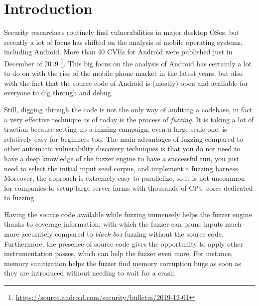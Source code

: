 \documentclass[a4paper,11pt,oneside]{report}
\begin{document}
\chapter{Introduction}

Security researchers routinely find vulnerabilities in major desktop OSes, but 
recently a lot of focus has shifted on the analysis of mobile operating 
systems, including Android.  More than 40 CVEs for Android were published just 
in December of 2019 
\footnote{\url{https://source.android.com/security/bulletin/2019-12-01}}.  This 
big focus on the analysis of Android has certainly a lot to do on with the rise 
of the mobile phone market in the latest years, but also with the fact that the 
source code of Android is (mostly) open and available for everyone to dig 
through and debug.

Still, digging through the code is not the only way of auditing a codebase, in 
fact a very effective technique as of today is the process of \emph{fuzzing}.  
It is taking a lot of traction because setting up a fuzzing campaign, even a 
large scale one, is relatively easy for beginners too. The main advantages of 
fuzzing compared to other automatic vulnerability discovery techniques is that 
you do not need to have a deep knowledge of the fuzzer engine to have a 
successful run, you just need to select the initial input seed corpus, and 
implement a fuzzing harness. Moreover, the approach is extremely easy to 
parallelize, so it is not uncommon for companies to setup large server farms 
with thousands of CPU cores dedicated to fuzzing.

Having the source code available while fuzzing immensely helps the fuzzer 
engine thanks to coverage information, with which the fuzzer can prune inputs 
much more accurately compared to \emph{black-box} fuzzing without the source 
code.  Furthermore, the presence of source code gives the opportunity to apply 
other instrumentation passes, which can help the fuzzer even more.  For 
instance, memory sanitization helps the fuzzer find memory corruption bugs as 
soon as they are introduced without needing to wait for a crash. 
\end{document}
